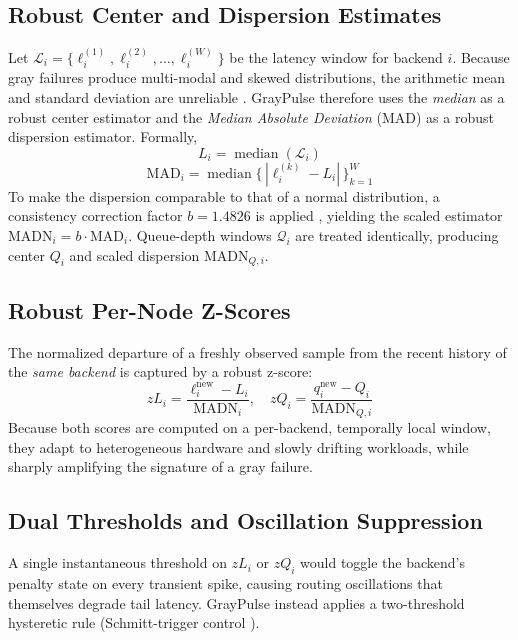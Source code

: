\documentclass[12pt,conference]{IEEEtran}
\begin{document}
\subsection{Robust Center and Dispersion Estimates}
Let $\mathcal{L}_i = \{ \ell_i^{(1)}, \ell_i^{(2)}, \dots, \ell_i^{(W)} \}$ be the latency window for backend $i$. Because gray failures produce multi-modal and skewed distributions, the arithmetic mean and standard deviation are unreliable \cite{hampel}. GrayPulse therefore uses the \emph{median} as a robust center estimator and the \emph{Median Absolute Deviation} (MAD) as a robust dispersion estimator. Formally,
\begin{equation}
L_i = \operatorname{median}(\mathcal{L}_i)
\end{equation}
\begin{equation}
\mathrm{MAD}_i = \operatorname{median}\{\, |\ell_i^{(k)} - L_i| \,\}_{k=1}^{W}
\end{equation}
To make the dispersion comparable to that of a normal distribution, a consistency correction factor $b=1.4826$ is applied \cite{rousseeuw}, yielding the scaled estimator $\mathrm{MADN}_i = b \cdot \mathrm{MAD}_i$. Queue-depth windows $\mathcal{Q}_i$ are treated identically, producing center $Q_i$ and scaled dispersion $\mathrm{MADN}_{Q,i}$.

\subsection{Robust Per-Node Z-Scores}
The normalized departure of a freshly observed sample from the recent history of the \emph{same backend} is captured by a robust z-score:
\begin{equation}
zL_i = \frac{\ell_i^{\text{new}} - L_i}{\mathrm{MADN}_i}, \quad zQ_i = \frac{q_i^{\text{new}} - Q_i}{\mathrm{MADN}_{Q,i}}
\end{equation}
Because both scores are computed on a per-backend, temporally local window, they adapt to heterogeneous hardware and slowly drifting workloads, while sharply amplifying the signature of a gray failure.

\subsection{Dual Thresholds and Oscillation Suppression}
A single instantaneous threshold on $zL_i$ or $zQ_i$ would toggle the backend's penalty state on every transient spike, causing routing oscillations that themselves degrade tail latency. GrayPulse instead applies a two-threshold hysteretic rule (Schmitt-trigger control \cite{horowitz}). 
\end{document}
